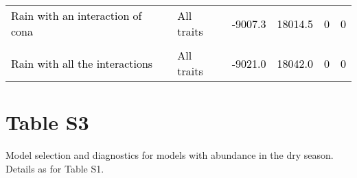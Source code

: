 \documentclass[
  12pt,
  letterpaper,
  DIV=11,
  numbers=noendperiod]{scrartcl}
\begin{document}
\begin{table}[H]
{\begin{tabular}[t]{llllll}
\textcolor{black}{Rain with an interaction of cona} & \textcolor{black}{All traits} & \textcolor{black}{-9007.3} & \textcolor{black}{18014.5} & \textcolor{black}{0} & \textcolor{black}{0}\\
\addlinespace
\cellcolor{gray!6}{\textcolor{black}{Rain with an interaction of cons and cona}} & \cellcolor{gray!6}{\textcolor{black}{All traits}} & \cellcolor{gray!6}{\textcolor{black}{-9008.1}} & \cellcolor{gray!6}{\textcolor{black}{18016.2}} & \cellcolor{gray!6}{\textcolor{black}{0}} & \cellcolor{gray!6}{\textcolor{black}{0}}\\
\textcolor{black}{Rain with all the interactions} & \textcolor{black}{All traits} & \textcolor{black}{-9021.0} & \textcolor{black}{18042.0} & \textcolor{black}{0} & \textcolor{black}{0}\\
\bottomrule
\end{tabular}}
\end{table}

\newpage

\hypertarget{table-s3}{%
\section{Table S3}\label{table-s3}}

Model selection and diagnostics for models with abundance in the dry
season. Details as for Table S1.
\end{document}
